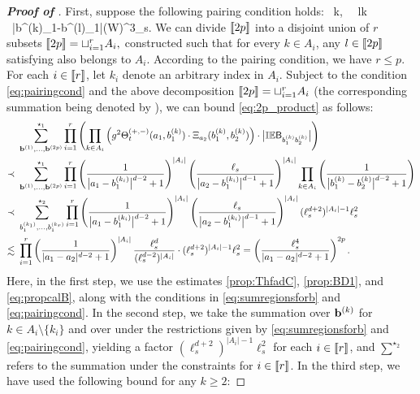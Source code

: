 \begin{proof}[\bf Proof of ]
First, suppose the following pairing condition holds: 
\be\label{eq:pairingcond}
\ k\in {},\  \ l\ne k \  \ |b^{(k)}_1-b^{(l)}_1|(\log W)^3\ell_s.\ee  
We can divide $\llbracket{2p}\rrbracket$ into a disjoint union of $r$ subsets $\llbracket{2p}\rrbracket=\sqcup_{i=1}^r A_i,$ constructed such that for every $k\in A_i$, any $l\in \llbracket{2p}\rrbracket$ satisfying  also belongs to $A_i$. According to the pairing condition, we have $r\le p$. For each $i\in\llbracket{r}\rrbracket$, let $k_i$ denote an arbitrary index in $A_i$. Subject to the condition \eqref{eq:pairingcond} and the above decomposition $\llbracket{2p}\rrbracket=\sqcup_{i=1}^r A_i$ (the corresponding summation being denoted by ), we can bound \eqref{eq:2p_product} as follows:
\begin{align}
    \label{eq:2p_product_pair}
&~\sum^{\star_1}_{{\mathbf{b}}^{(1)},\ldots, {\mathbf{b}}^{(2p)}} \prod_{i=1}^{r}\left(\prod_{k\in A_i}\left({g^2\Theta_{t}^{(+,-)} (a_1,b_1^{(k)})\cdot \Xi_{a_2}(b_1^{(k)},b_2^{(k)})}\right)\cdot \big|\mathbb{IE} \mathsf B_{b_1^{(k)}b_2^{(k)}}\big|\right) \\
\prec &~\sum^{\star_1}_{{\mathbf{b}}^{(1)},\ldots, {\mathbf{b}}^{(2p)}} \prod_{i=1}^{r}\left( \frac{1}{\big|a_1-b_1^{(k_i)}\big|^{d-2}+1}\right)^{|A_i|}\left({\frac{\ell_s}{\big|a_2-b_1^{(k_i)}\big|^{d-1}+1}}\right)^{|A_i|}\prod_{k\in A_i}\left({\frac{1}{\big|b_1^{(k)}-b_2^{(k)}\big|^{d-2}+1}}\right) \nonumber\\
\prec &~\sum^{\star_2}_{b_1^{(k_1)},\ldots, b_1^{(k_r)}} \prod_{i=1}^{r}\left( \frac{1}{\big|a_1-b_1^{(k_i)}\big|^{d-2}+1}\right)^{|A_i|}\left({\frac{\ell_s}{\big|a_2-b_1^{(k_i)}\big|^{d-1}+1}}\right)^{|A_i|} (\ell_s^{d+2})^{|A_i|-1}\ell_s^2 \nonumber \\
\lesssim &~\prod_{i=1}^{r}\left( \frac{1}{|a_1-a_2|^{d-2}+1}\right)^{|A_i|}\frac{\ell_s^d}{(\ell_s^{d-2})^{|A_i|}} \cdot (\ell_s^{d+2})^{|A_i|-1} \ell_s^2=\left(\frac{\ell_s^4}{|a_1-a_2|^{d-2}+1}\right)^{2p}.\nonumber 
\end{align}
Here, in the first step, we use the estimates \eqref{prop:ThfadC}, \eqref{prop:BD1}, and \eqref{eq:propcalB}, along with the conditions in \eqref{eq:sumregionsforb} and \eqref{eq:pairingcond}. In the second step, we take the summation over ${\mathbf{b}}^{(k)}$ for $k\in A_i\setminus\{k_i\}$ and over  under the restrictions given by \eqref{eq:sumregionsforb} and \eqref{eq:pairingcond}, yielding a factor $(\ell_s^{d+2})^{|A_i|-1}\ell_s^2$ for each $i\in\llbracket{r}\rrbracket$, and $\sum^{\star_2}$ refers to the summation under the constraints  for $i\in\llbracket{r}\rrbracket$. In the third step, we have used the following bound for any $k\ge 2$:

\end{proof}
